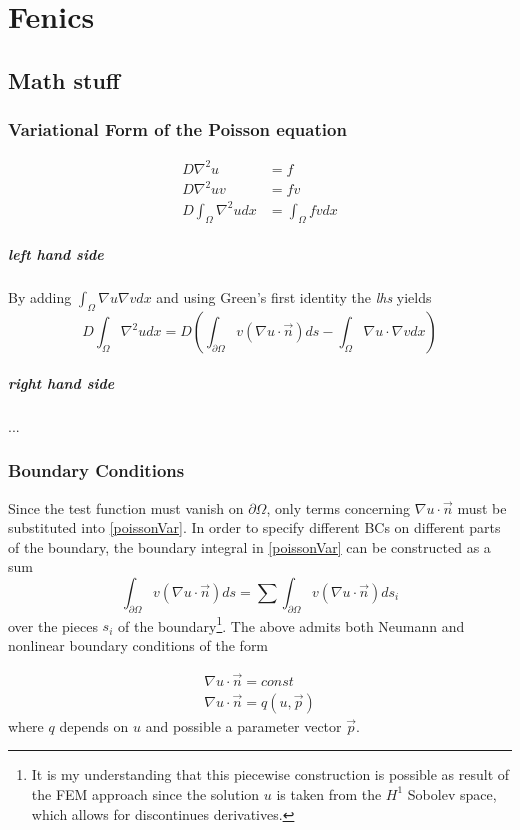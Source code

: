 \documentclass[12pt,a4paper]{scrreprt}
\begin{document}
 
	\chapter{Fenics}
		\section{Math stuff}
			\subsection{Variational Form of the Poisson equation}
			\begin{align*}
				D \nabla^2 u  &= f\\
				D \nabla^2 u v &= f v \\
				D \int_\Omega \nabla^2 u dx &= \int_\Omega f v dx
			\end{align*}
			\paragraph{left hand side}
			By adding $\int_\Omega \nabla u \nabla v dx$ and using Green's first  identity the \textit{lhs} yields
			\begin{equation}\label{poissonVar}
				D \int_\Omega \nabla^2 u dx  
				= 
				D \left( \int_{\partial\Omega} v(\nabla u \cdot \vec{n}) ds - \int_\Omega \nabla u \cdot \nabla v dx \right)
			\end{equation}
			\paragraph{right hand side}
				...
			\subsection{Boundary Conditions}
			Since the test function must vanish on $\partial \Omega$, only terms concerning $\nabla u \cdot \vec{n}$ must be substituted into \ref{poissonVar}. In order to specify different BCs on different parts of the boundary, the boundary integral in \ref{poissonVar} can be constructed as a sum
			\begin{equation*}
				\int_{\partial\Omega} v(\nabla u \cdot \vec{n})ds = \sum \int_{\partial\Omega} v(\nabla u \cdot \vec{n})ds_i 
			\end{equation*}
			over the pieces $s_i$ of the boundary\footnote{It is my understanding that this piecewise construction is possible as result of the FEM approach since the solution $u$ is taken from the $H^1$ Sobolev space, which allows for discontinues derivatives.}.
			The above admits both Neumann and nonlinear boundary conditions of the form
			
			\begin{align*}
				\nabla u \cdot \vec{n} = const\\
				\nabla u \cdot \vec{n} = q(u,\vec{p})
			\end{align*}
			where $q$ depends on $u$ and possible a parameter vector $\vec{p}$.
	
\end{document}
